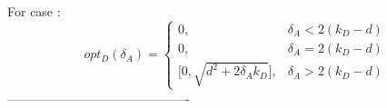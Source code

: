 For case :
 \begin{displaymath}
  opt_{D}(\delta_{A}) = \left\{
     \begin{array}{lr}
       0, & \delta_{A} < 2(k_{D} - d)\\
       0, & \delta_{A} = 2(k_{D} - d) \\
       \big[0,\sqrt{d^{2} + 2\delta_{A}k_{D}}\big], & \delta_{A} > 2(k_{D} - d)
     \end{array}
   \right.
\end{displaymath}
-------------------------------------------\\


